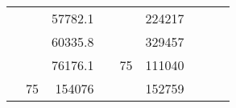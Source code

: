 \begin{table}[H]
\begin{tabular}{|ccrccrccc}
\multicolumn{1}{|c|}{\cellcolor[HTML]{FFFFC7}}                                & \multicolumn{1}{c|}{\cellcolor[HTML]{DAE8FC}}                      & \multicolumn{1}{r|}{\cellcolor[HTML]{DAE8FC}57782.1}   & \multicolumn{1}{c|}{\cellcolor[HTML]{FFFFC7}}                                & \multicolumn{1}{c|}{\cellcolor[HTML]{DAE8FC}}                       & \multicolumn{1}{r|}{\cellcolor[HTML]{DDFDFF}224217}    &                                                                              &                                                                    &                                                        \\ \cline{3-3} \cline{6-6}
\multicolumn{1}{|c|}{\cellcolor[HTML]{FFFFC7}}                                & \multicolumn{1}{c|}{\cellcolor[HTML]{DAE8FC}}                      & \multicolumn{1}{r|}{\cellcolor[HTML]{DDFDFF}60335.8}   & \multicolumn{1}{c|}{\cellcolor[HTML]{FFFFC7}}                                & \multicolumn{1}{c|}{\cellcolor[HTML]{DAE8FC}}                       & \multicolumn{1}{r|}{\cellcolor[HTML]{DAE8FC}329457}    &                                                                              &                                                                    &                                                        \\ \cline{3-3} \cline{6-6}
\multicolumn{1}{|c|}{\cellcolor[HTML]{FFFFC7}}                                & \multicolumn{1}{c|}{\cellcolor[HTML]{DAE8FC}}                      & \multicolumn{1}{r|}{\cellcolor[HTML]{DAE8FC}76176.1}   & \multicolumn{1}{c|}{\cellcolor[HTML]{FFFFC7}}                                & \multicolumn{1}{c|}{\multirow{-10}{*}{\cellcolor[HTML]{DAE8FC}75}}  & \multicolumn{1}{r|}{\cellcolor[HTML]{DDFDFF}111040}    &                                                                              &                                                                    &                                                        \\ \cline{3-3} \cline{5-6}
\multicolumn{1}{|c|}{\cellcolor[HTML]{FFFFC7}}                                & \multicolumn{1}{c|}{\multirow{-10}{*}{\cellcolor[HTML]{DAE8FC}75}} & \multicolumn{1}{r|}{\cellcolor[HTML]{DDFDFF}154076}    & \multicolumn{1}{c|}{\cellcolor[HTML]{FFFFC7}}                                & \multicolumn{1}{c|}{\cellcolor[HTML]{DDFDFF}}                       & \multicolumn{1}{r|}{\cellcolor[HTML]{DAE8FC}152759}    &                                                                              &                                                                    &                                                        \\ \cline{2-3} \cline{6-6}

\end{tabular}
\end{table}
